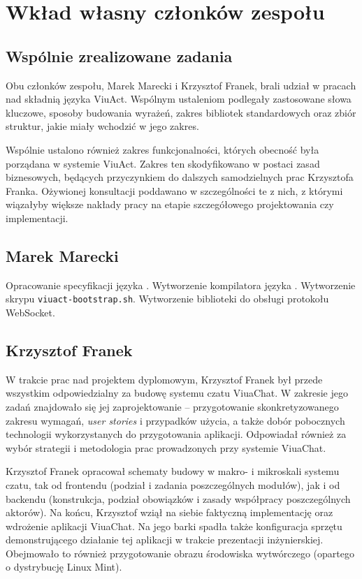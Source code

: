 \chapter{Wkład własny członków zespołu}
\label{wklad_wlasny}

\section{Wspólnie zrealizowane zadania}
Obu członków zespołu, Marek Marecki i Krzysztof Franek, brali udział w pracach
nad składnią języka ViuAct. Wspólnym ustaleniom podlegały zastosowane słowa
kluczowe, sposoby budowania wyrażeń, zakres bibliotek standardowych oraz
zbiór struktur, jakie miały wchodzić w jego zakres.

Wspólnie ustalono również zakres funkcjonalności, których obecność była porządana
w systemie ViuAct. Zakres ten skodyfikowano w postaci zasad biznesowych, będących
przyczynkiem do dalszych samodzielnych prac Krzysztofa Franka. Ożywionej
konsultacji poddawano w szczególności te z nich, z którymi wiązałyby
większe nakłady pracy na etapie szczegółowego projektowania czy implementacji.

\section{Marek Marecki}

Opracowanie specyfikacji języka \ViuAct.
Wytworzenie kompilatora języka \ViuAct.
Wytworzenie skrypu \texttt{viuact-bootstrap.sh}.
Wytworzenie biblioteki do obsługi protokołu WebSocket.

\section{Krzysztof Franek}
W trakcie prac nad projektem dyplomowym, Krzysztof Franek był przede wszystkim
odpowiedzialny za budowę systemu czatu ViuaChat. W zakresie jego zadań znajdowało
się jej zaprojektowanie -- przygotowanie skonkretyzowanego zakresu wymagań,
\textit{user stories} i przypadków użycia, a także dobór pobocznych technologii
wykorzystanych do przygotowania aplikacji. Odpowiadał również za wybór strategii
i metodologia prac prowadzonych przy systemie ViuaChat.

Krzysztof Franek opracował schematy budowy w makro- i mikroskali
systemu czatu, tak od frontendu (podział
i zadania poszczególnych modułów), jak i od backendu (konstrukcja, podział obowiązków
i zasady współpracy poszczególnych aktorów). Na końcu, Krzysztof wziął na siebie
faktyczną implementację oraz wdrożenie aplikacji ViuaChat. Na jego barki spadła
także konfiguracja sprzętu demonstrującego działanie tej aplikacji w trakcie
prezentacji inżynierskiej. Obejmowało to również przygotowanie obrazu środowiska
wytwórczego (opartego o dystrybucję Linux Mint).

